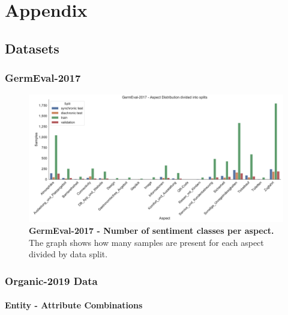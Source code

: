 \chapter{Appendix}

\section{Datasets}

\subsection{GermEval-2017}
\begin{figure}[H]
	\centering
	\includegraphics[width=\textwidth]{figures/08_appendix/08_germevalAspects}
	\caption{\textbf{GermEval-2017 - Number of sentiment classes per aspect.} The graph shows how many samples are present for each aspect divided by data split.}
	\label{fig:08_germEvalStatistics}
\end{figure}

\subsection{Organic-2019 Data}

\subsubsection*{Entity - Attribute Combinations}

